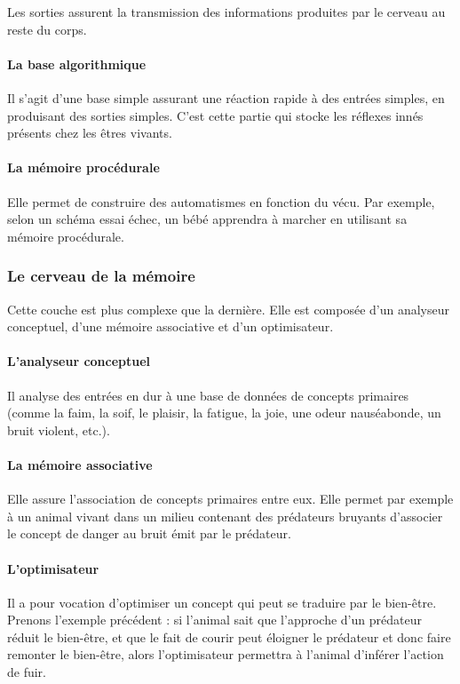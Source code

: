 Les sorties assurent la transmission des informations produites par le cerveau au reste du corps.

\paragraph{La base algorithmique} Il s'agit d'une base simple assurant une réaction rapide à des entrées simples, en produisant des sorties simples. C'est cette partie qui stocke les réflexes innés présents chez les êtres vivants. 

\paragraph{La mémoire procédurale} Elle permet de construire des automatismes en fonction du vécu. Par exemple, selon un schéma essai échec, un bébé apprendra à marcher en utilisant sa mémoire procédurale.

\subsubsection{Le cerveau de la mémoire} Cette couche est plus
complexe que la dernière. Elle est composée d'un analyseur conceptuel, d'une mémoire
associative et d'un optimisateur.

\paragraph {L'analyseur conceptuel} Il analyse des entrées en dur à une base de
données de concepts primaires (comme la faim, la soif, le plaisir, la fatigue, la joie, une odeur
nauséabonde, un bruit violent, etc.).
\paragraph {La mémoire associative} Elle assure l'association de concepts primaires
entre eux. Elle permet par exemple à un animal vivant dans un milieu contenant des prédateurs
bruyants d’associer le concept de danger au bruit émit par le prédateur.
\paragraph {L’optimisateur} Il a pour vocation d’optimiser un concept qui peut
se traduire par le bien-être. Prenons l’exemple précédent : si l'animal sait que l’approche d’un prédateur réduit le bien-être, et que le fait de courir peut éloigner le
prédateur et donc faire remonter le bien-être, alors l'optimisateur permettra à l'animal d'inférer l’action de fuir.

